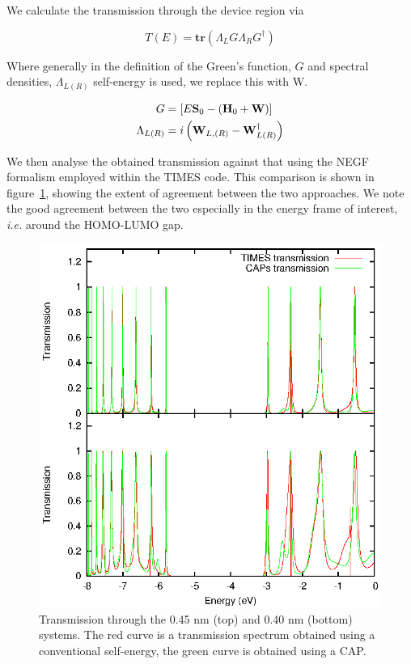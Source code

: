 We calculate the transmission through the device region via

\begin{equation}
	T(E) = \mathbf{tr}(\Lambda_L G \Lambda_R G^\dagger)	
	\label{eq:transmission}
\end{equation}

Where generally in the definition of the Green's function, $G$ and spectral
densities, $\Lambda_{L(R)}$ self-energy is used, we replace this with W.

\begin{subequations}
\begin{align}
	G &= [E\mathbf{S}_0 - (\mathbf{H}_0 + \mathbf{W})] \\
	\Lambda_{L(R)} &= i \left( \mathbf{W}_{L,(R)}
	                  - \mathbf{W}^\dagger_{L(R)} \right)
\end{align}
\label{eq:glambdadef}
\end{subequations}

We then analyse the obtained transmission against that using the NEGF formalism
employed within the TIMES code. This comparison is shown in
figure~\ref{fig:transdat}, showing the extent of agreement between the two
approaches. We note the good agreement between the two especially in the energy
frame of interest, \textit{i.e.} around the \ac{HOMO}-\ac{LUMO} gap.

\begin{figure} 
	\begin{center}
		\includegraphics[width=0.9\linewidth]{figures/transdat.eps}
	\end{center}
	\caption{Transmission through the 0.45 nm (top) and 0.40 nm (bottom)
	         systems. The red curve is a transmission spectrum obtained
		 using a conventional self-energy, the green curve is obtained
		 using a \ac{CAP}.}
	\label{fig:transdat}
\end{figure}

